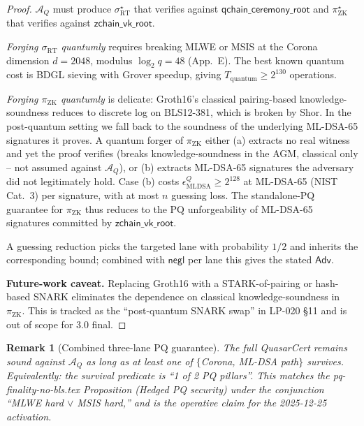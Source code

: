 \documentclass[11pt]{article}
\newtheorem{remark}{Remark}
\begin{document}
\begin{proof}
$\mathcal{A}_Q$ must produce $\sigma_{\mathrm{RT}}^\star$ that verifies
against $\mathsf{qchain\_ceremony\_root}$ and $\pi_{\mathrm{ZK}}^\star$
that verifies against $\mathsf{zchain\_vk\_root}$.

\medskip\noindent
\textit{Forging $\sigma_{\mathrm{RT}}$ quantumly} requires breaking
MLWE or MSIS at the Corona dimension $d = 2048$, modulus
$\log_2 q = 48$ (App.~E).  The best known quantum cost is BDGL sieving
with Grover speedup, giving $T_{\mathrm{quantum}} \geq 2^{130}$
operations.

\medskip\noindent
\textit{Forging $\pi_{\mathrm{ZK}}$ quantumly} is delicate: Groth16's
classical pairing-based knowledge-soundness reduces to discrete log on
BLS12-381, which is broken by Shor.  In the post-quantum setting we
fall back to the soundness of the underlying ML-DSA-65 signatures it
proves.  A quantum forger of $\pi_{\mathrm{ZK}}$ either (a) extracts
no real witness and yet the proof verifies (breaks knowledge-soundness
in the AGM, classical only -- not assumed against $\mathcal{A}_Q$), or
(b) extracts ML-DSA-65 signatures the adversary did not legitimately
hold.  Case (b) costs $\epsilon_{\mathrm{MLDSA}}^{Q} \geq 2^{128}$ at
ML-DSA-65 (NIST Cat.~3) per signature, with at most $n$ guessing loss.
The standalone-PQ guarantee for $\pi_{\mathrm{ZK}}$ thus reduces to the
PQ unforgeability of ML-DSA-65 signatures committed by
$\mathsf{zchain\_vk\_root}$.

\medskip\noindent
A guessing reduction picks the targeted lane with probability $1/2$ and
inherits the corresponding bound; combined with $\mathsf{negl}$ per
lane this gives the stated $\mathsf{Adv}$.

\medskip\noindent
\textbf{Future-work caveat.}  Replacing Groth16 with a STARK-of-pairing
or hash-based SNARK eliminates the dependence on classical
knowledge-soundness in $\pi_{\mathrm{ZK}}$.  This is tracked as the
``post-quantum SNARK swap'' in LP-020 \S11 and is out of scope for 3.0
final.
\end{proof}

\begin{remark}[Combined three-lane PQ guarantee]
The full QuasarCert remains sound against $\mathcal{A}_Q$ as long as
\emph{at least one} of $\{$Corona, ML-DSA path$\}$ survives.
Equivalently: the survival predicate is ``1 of 2 PQ pillars''.  This
matches the pq-finality-no-bls.tex Proposition (Hedged PQ security)
under the conjunction ``MLWE hard $\lor$ MSIS hard,'' and is the
operative claim for the 2025-12-25 activation.
\end{remark}
\end{document}
